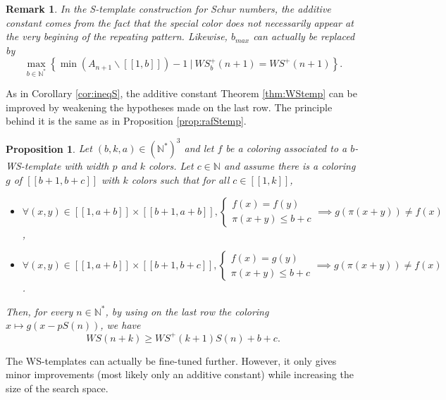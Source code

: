 \documentclass{article}
\newtheorem{computational theorem}[definition]{Computational Theorem}
\newtheorem{remark}[definition]{Remark}
\newtheorem{proposition}[definition]{Proposition}
\newcommand{\WS}{\mathit{WS}}
\begin{document}
\begin{remark}
In the S-template construction for Schur numbers, the additive constant comes from the fact that the special color does
not necessarily appear at the very begining of the repeating pattern. Likewise, \(b_{max}\) can actually be replaced by
\[
\max_{b \in \mathbb{N}^*} \left\{\min (A_{n+1} \backslash [\![1, b ]\!]) - 1~|~ \WS_b^+(n+1) = \WS^+(n+1) \right\}.
\]
\end{remark}

As in Corollary \ref{cor:ineqS}, the additive constant Theorem \ref{thm:WStemp} can be improved 
by weakening the hypotheses made on the last row. The principle behind it is the same as in Proposition \ref{prop:rafStemp}.

\begin{proposition}
\label{prop:tunelastrow}
Let \((b, k, a) \in (\mathbb{N}^*)^3\) and let \(f\) be a coloring associated to a \(b\)-WS-template with width \(p\) and \(k\) colors. Let
\(c \in \mathbb{N}\) and assume there is a coloring \(g\) of \([\![b + 1, b + c]\!]\) with \(k\) colors such that for all \(c \in [\![1, k]\!]\),

\begin{itemize}
\item \(\forall (x, y) \in  [\![1, a + b]\!] \times  [\![b + 1, a + b]\!],  \left\{
	\begin{array}{l}
		f(x) = f(y) \\
		\pi(x + y) \leqslant b + c
	\end{array}
	\right. \implies g(\pi(x + y)) \neq f(x)\),
\item \(\forall (x, y) \in  [\![1, a + b]\!] \times  [\![b + 1, b + c]\!], \left\{
	\begin{array}{l}
		f(x) = g(y) \\
		\pi(x + y) \leqslant b + c
	\end{array}
	\right. \implies g(\pi(x + y)) \neq f(x)\).
\end{itemize}

Then, for every \(n \in \mathbb{N}^*\), by using on the last row the coloring \(x \longmapsto g(x - p S(n))\), we have\\
\[ \WS(n+k) \geqslant \WS^+(k+1) S(n) + b + c.\]
\end{proposition}

The WS-templates can actually be fine-tuned further. However, it only gives minor improvements (most likely only an 
additive constant) while increasing the size of the search space. 
\end{document}
